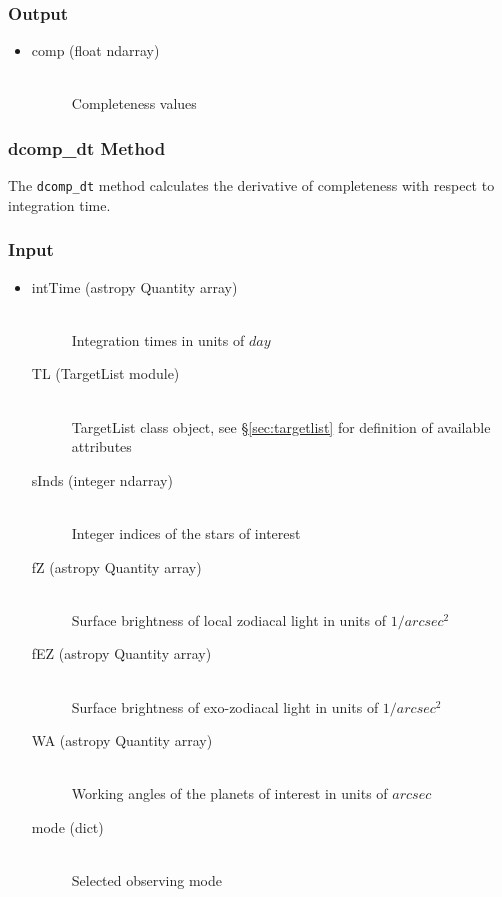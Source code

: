 \documentclass[cleanfoot]{asme2ej}
\begin{document}
\subsubsection*{Output}
\begin{itemize}
\item 
\begin{description}
    \item[comp (float ndarray)] \hfill \\
        Completeness values
\end{description}
\end{itemize}

\subsubsection{dcomp\_dt Method}
\label{sec:dcompdt}
The \verb+dcomp_dt+ method calculates the derivative of completeness with respect to integration time.

\subsubsection*{Input}
\begin{itemize}
\item 
\begin{description}
    \item[intTime (astropy Quantity array)] \hfill \\ Integration times in units of $ day $
    \item[TL (TargetList module)] \hfill \\ TargetList class object, see \S\ref{sec:targetlist} for definition of available attributes
    \item[sInds (integer ndarray)] \hfill \\ Integer indices of the stars of interest
    \item[fZ (astropy Quantity array)] \hfill \\ Surface brightness of local zodiacal light in units of $ 1/arcsec^2 $
    \item[fEZ (astropy Quantity array)] \hfill \\ Surface brightness of exo-zodiacal light in units of $ 1/arcsec^2 $
    \item[WA (astropy Quantity array)] \hfill \\ Working angles of the planets of interest in units of $ arcsec $
    \item[mode (dict)] \hfill \\ Selected observing mode
\end{description}
\end{itemize}
\end{document}

